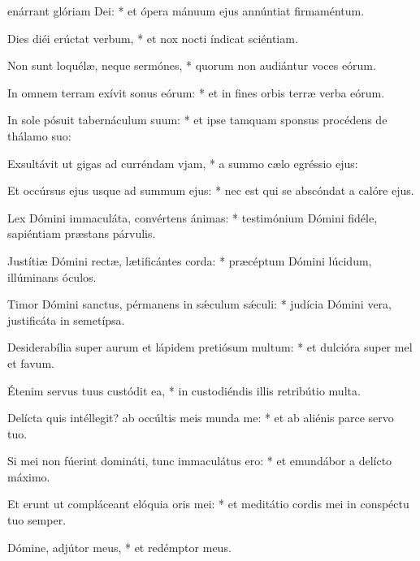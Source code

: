 \begin{psalmus}
    
     enárrant glóriam Dei: * et ópera mánuum ejus annúntiat firmaméntum.
    
    Dies diéi erúctat verbum, * et nox nocti índicat sciéntiam.
    
    Non sunt loquélæ, neque sermónes, * quorum non audiántur voces eórum.
    
    In omnem terram exívit sonus eórum: * et in fines orbis terræ verba eórum.
    
    In sole pósuit tabernáculum suum: * et ipse tamquam sponsus procédens de thálamo suo:
    
    Exsultávit ut gigas ad curréndam vjam, * a summo cælo egréssio ejus:
    
    Et occúrsus ejus usque ad summum ejus: * nec est qui se abscóndat a calóre ejus.
    
    Lex Dómini immaculáta, convértens ánimas: * testimónium Dómini fidéle, sapiéntiam præstans párvulis.
    
    Justítiæ Dómini rectæ, lætificántes corda: * præcéptum Dómini lúcidum, illúminans óculos.
    
    Timor Dómini sanctus, pérmanens in sǽculum sǽculi: * judícia Dómini vera, justificáta in semetípsa.
    
    Desiderabília super aurum et lápidem pretiósum multum: * et dulcióra super mel et favum.
    
    Étenim servus tuus custódit ea, * in custodiéndis illis retribútio multa.
    
    Delícta quis intéllegit? ab occúltis meis munda me: * et ab aliénis parce servo tuo.
    
    Si mei non fúerint domináti, tunc immaculátus ero: * et emundábor a delícto máximo.
    
    Et erunt ut compláceant elóquia oris mei: * et meditátio cordis mei in conspéctu tuo semper.
    
    Dómine, adjútor meus, * et redémptor meus.
    
    \end{psalmus}